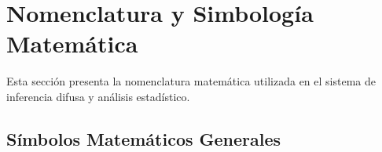 
\section{Nomenclatura y Simbología Matemática}
\label{sec:nomenclatura}

Esta sección presenta la nomenclatura matemática utilizada en el sistema de inferencia difusa y análisis estadístico.

\subsection{Símbolos Matemáticos Generales}

